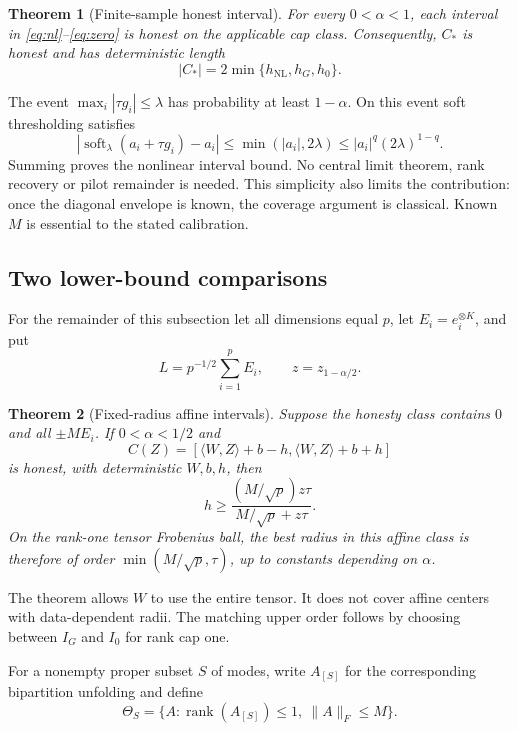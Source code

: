 \documentclass[11pt]{article}
\newtheorem{theorem}{Theorem}
\theoremstyle{remark}
\newcommand{\ip}[2]{\langle #1,#2\rangle}
\newcommand{\norm}[1]{\lVert #1\rVert}
\newcommand{\rank}{\operatorname{rank}}
\newcommand{\soft}{\operatorname{soft}}
\newcommand{\NL}{\mathrm{NL}}
\begin{document}
\begin{theorem}[Finite-sample honest interval]\label{thm:coverage}
For every $0<\alpha<1$, each interval in \eqref{eq:nl}--\eqref{eq:zero} is honest on the applicable cap class. Consequently, $C_*$ is honest and has deterministic length
\begin{equation}\label{eq:length}
 |C_*|=2\min\{h_{\NL},h_G,h_0\}.
\end{equation}
\end{theorem}

The event $\max_i|\tau g_i|\le\lambda$ has probability at least $1-\alpha$. On this event soft thresholding satisfies
\[
 |\soft_\lambda(a_i+\tau g_i)-a_i|\le\min(|a_i|,2\lambda)
 \le |a_i|^q(2\lambda)^{1-q}.
\]
Summing proves the nonlinear interval bound. No central limit theorem, rank recovery or pilot remainder is needed. This simplicity also limits the contribution: once the diagonal envelope is known, the coverage argument is classical. Known $M$ is essential to the stated calibration.

\subsection{Two lower-bound comparisons}

For the remainder of this subsection let all dimensions equal $p$, let $E_i=e_i^{\otimes K}$, and put
\begin{equation}\label{eq:equalL}
 L=p^{-1/2}\sum_{i=1}^p E_i,\qquad z=z_{1-\alpha/2}.
\end{equation}

\begin{theorem}[Fixed-radius affine intervals]\label{thm:affine}
Suppose the honesty class contains $0$ and all $\pm M E_i$. If $0<\alpha<1/2$ and
\[
 C(Z)=[\ip WZ+b-h,\ip WZ+b+h]
\]
is honest, with deterministic $W,b,h$, then
\begin{equation}\label{eq:affinelower}
 h\ge\frac{(M/\sqrt p)z\tau}{M/\sqrt p+z\tau}.
\end{equation}
On the rank-one tensor Frobenius ball, the best radius in this affine class is therefore of order $\min(M/\sqrt p,\tau)$, up to constants depending on $\alpha$.
\end{theorem}

The theorem allows $W$ to use the entire tensor. It does not cover affine centers with data-dependent radii. The matching upper order follows by choosing between $I_G$ and $I_0$ for rank cap one.

For a nonempty proper subset $S$ of modes, write $A_{[S]}$ for the corresponding bipartition unfolding and define
\begin{equation}\label{eq:relax}
 \Theta_S=\{A:\rank(A_{[S]})\le1,\ \norm A_F\le M\}.
\end{equation}
\end{document}
